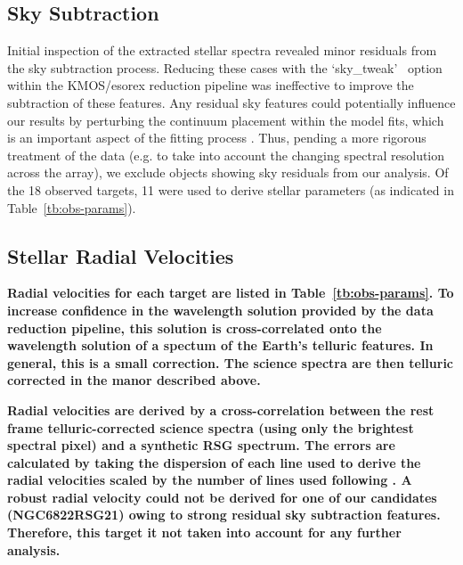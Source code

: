 \documentclass[iop]{emulateapj}
\begin{document}

\subsection{Sky Subtraction} %
\label{sub:sky_subtraction}

Initial inspection of the extracted stellar spectra revealed minor residuals from the sky subtraction process.
Reducing these cases with the \textquoteleft sky\_tweak\textquoteright
~option within the KMOS/esorex reduction pipeline was ineffective to improve the subtraction of these features.
Any residual sky features could potentially influence our results by perturbing the continuum placement within the model fits, which is an important aspect of the fitting process
\citep[see][for more discussion]{2014ApJ...788...58G,Davies-prep}.
Thus, pending a more rigorous treatment of the data
(e.g. to take into account the changing spectral resolution across the array),
we exclude objects showing sky residuals from our analysis.
Of the 18 observed targets, 11 were used to derive stellar parameters
(as indicated in Table~\ref{tb:obs-params}).

\subsection{Stellar Radial Velocities} %
\label{sub:RVs}

\textbf{
  Radial velocities for each target are listed in Table~\ref{tb:obs-params}.
  To increase confidence in the wavelength solution provided by the data reduction pipeline,
  this solution is cross-correlated onto the wavelength solution of a spectum of the Earth's telluric features.
  In general, this is a small correction.
  The science spectra are then telluric corrected in the manor described above.}

\textbf{
  Radial velocities are derived by a cross-correlation between the rest frame telluric-corrected science spectra
  (using only the brightest spectral pixel) and a synthetic RSG spectrum.
  The errors are calculated by taking the dispersion of each line used to derive the radial velocities scaled by the number of lines used following
  \cite{2014arXiv1410.5825L}.
  A robust radial velocity could not be derived for one of our candidates
  (NGC6822RSG21) owing to strong residual sky subtraction features.
  Therefore, this target it not taken into account for any further analysis.}
\end{document}
